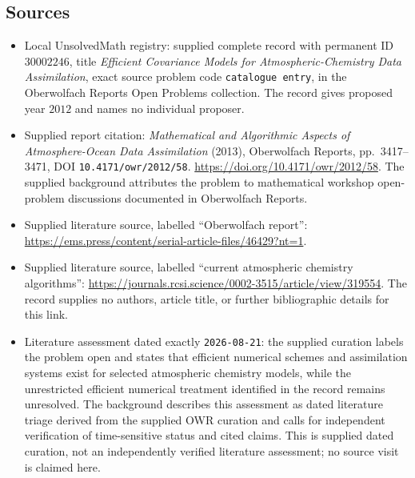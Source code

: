 \documentclass[11pt]{article}
\begin{document}
\subsection{Sources}
\begin{itemize}
\item Local UnsolvedMath registry: supplied complete record with permanent ID \(30002246\), title \emph{Efficient Covariance Models for Atmospheric-Chemistry Data Assimilation}, exact source problem code \texttt{catalogue entry}, in the Oberwolfach Reports Open Problems collection. The record gives proposed year \(2012\) and names no individual proposer.
\item Supplied report citation: \emph{Mathematical and Algorithmic Aspects of Atmosphere-Ocean Data Assimilation} (2013), Oberwolfach Reports, pp.~3417--3471, DOI \texttt{10.4171/owr/2012/58}. \url{https://doi.org/10.4171/owr/2012/58}. The supplied background attributes the problem to mathematical workshop open-problem discussions documented in Oberwolfach Reports.
\item Supplied literature source, labelled ``Oberwolfach report'': \url{https://ems.press/content/serial-article-files/46429?nt=1}.
\item Supplied literature source, labelled ``current atmospheric chemistry algorithms'': \url{https://journals.rcsi.science/0002-3515/article/view/319554}. The record supplies no authors, article title, or further bibliographic details for this link.
\item Literature assessment dated exactly \texttt{2026-08-21}: the supplied curation labels the problem open and states that efficient numerical schemes and assimilation systems exist for selected atmospheric chemistry models, while the unrestricted efficient numerical treatment identified in the record remains unresolved. The background describes this assessment as dated literature triage derived from the supplied OWR curation and calls for independent verification of time-sensitive status and cited claims. This is supplied dated curation, not an independently verified literature assessment; no source visit is claimed here.
\end{itemize}
\end{document}
